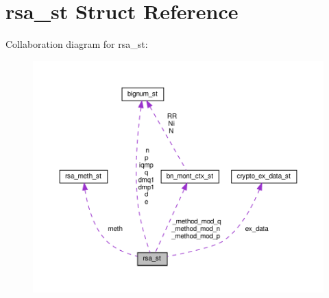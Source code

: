 \hypertarget{structrsa__st}{}\section{rsa\+\_\+st Struct Reference}
\label{structrsa__st}


Collaboration diagram for rsa\+\_\+st\+:
\nopagebreak
\begin{figure}[H]
\begin{center}
\leavevmode
\includegraphics[width=350pt]{structrsa__st__coll__graph}
\end{center}
\end{figure}
